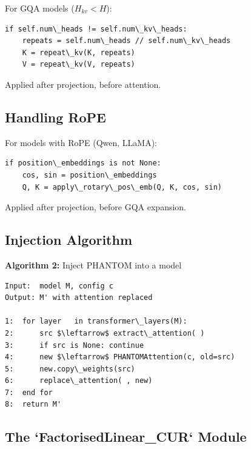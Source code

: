 For GQA models ($H_{kv} < H$):

\begin{lstlisting}
if self.num\_heads != self.num\_kv\_heads:
    repeats = self.num\_heads // self.num\_kv\_heads
    K = repeat\_kv(K, repeats)
    V = repeat\_kv(V, repeats)
\end{lstlisting}

Applied after projection, before attention.

\subsection{Handling RoPE}

For models with RoPE (Qwen, LLaMA):

\begin{lstlisting}
if position\_embeddings is not None:
    cos, sin = position\_embeddings
    Q, K = apply\_rotary\_pos\_emb(Q, K, cos, sin)
\end{lstlisting}

Applied after projection, before GQA expansion.

\subsection{Injection Algorithm}

\textbf{Algorithm 2:} Inject PHANTOM into a model
\begin{lstlisting}
Input:  model M, config c
Output: M' with attention replaced

1:  for layer   in transformer\_layers(M):
2:      src $\leftarrow$ extract\_attention( )
3:      if src is None: continue
4:      new $\leftarrow$ PHANTOMAttention(c, old=src)
5:      new.copy\_weights(src)
6:      replace\_attention( , new)
7:  end for
8:  return M'
\end{lstlisting}

\subsection{The `FactorisedLinear\_CUR` Module}


